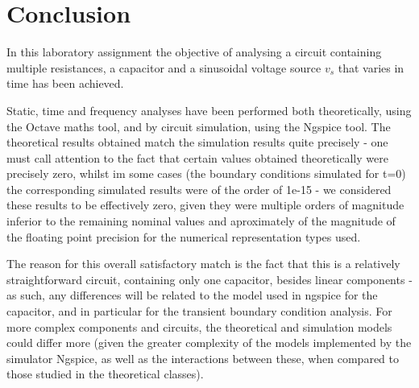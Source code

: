 \section{Conclusion}
\label{sec:conclusion}

In this laboratory assignment the objective of analysing a circuit containing multiple resistances, a capacitor and a sinusoidal voltage source $v_s$ that  varies in time has been achieved.\par
Static, time and frequency analyses have been performed both theoretically, using the Octave maths tool, and by circuit simulation, using the
Ngspice tool. The theoretical results obtained match the simulation results quite precisely - one must call attention to the fact that certain values obtained theoretically were precisely zero, whilst im some cases (the boundary conditions simulated for t=0) the corresponding simulated results were of the order of 1e-15 - we considered these results to be effectively zero, given they were multiple orders of magnitude inferior to the remaining nominal values and aproximately of the magnitude of the floating point precision for the numerical representation types used.\par
The reason for this overall satisfactory match is the fact that this is a
relatively straightforward circuit, containing only one capacitor, besides linear components - as such, any differences will be related to the model used in ngspice for the capacitor, and in particular for the transient boundary condition analysis. For more complex components and circuits, the
theoretical and simulation models could differ more (given the greater complexity of the models implemented by the simulator Ngspice, as well as the interactions between these, when compared to those studied in the theoretical classes).\par

